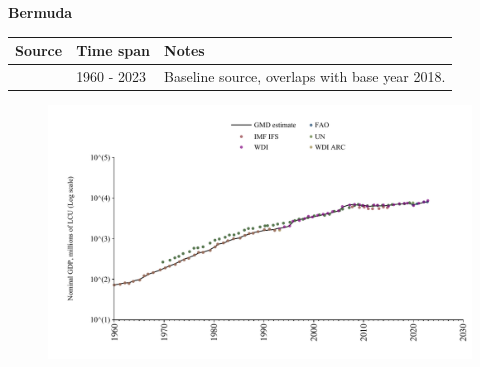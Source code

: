 \documentclass[12pt,a4paper,landscape]{article}
\begin{document}
\begin{adjustbox}{max totalsize={\paperwidth}{\paperheight},center}
\begin{minipage}[t][\textheight][t]{\textwidth}
\vspace*{0.5cm}
{}
\begin{center}
{\Large\bfseries Bermuda}
\end{center}
\vspace{0.5cm}
\begin{table}[H]
\centering
\small
\begin{tabular}{|l|l|l|}
\hline
\textbf{Source} & \textbf{Time span} & \textbf{Notes} \\
\hline
\rowcolor{white}\cite{WDI}& 1960 - 2023 &Baseline source, overlaps with base year 2018.\\
\hline
\end{tabular}
\end{table}
\begin{figure}[H]
\centering
\includegraphics[width=\textwidth,height=0.6\textheight,keepaspectratio]{graphs/BMU_nGDP.pdf}
\end{figure}
\end{minipage}
\end{adjustbox}
\end{document}

